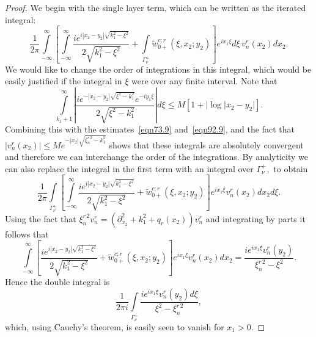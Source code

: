 \documentclass[11pt]{article}
\newcommand\tw{\tilde w_{0+}}
\newcommand\pa{\partial}
\theoremstyle{definition}
\theoremstyle{remark}
\begin{document}
\begin{proof}
  We begin with the single layer term, which can be written as the iterated
  integral:
  \begin{equation}\label{eqn213.91}
    \frac{1}{2\pi}
    \int\limits_{-\infty}^{\infty}\left[\int\limits_{-\infty}^{\infty}\frac{ie^{i|x_2-y_2|\sqrt{k_1^2-\xi^2}}}{2\sqrt{k_1^2-\xi^2}}+
       \int\limits_{\Gamma_{\nu}^+} \tw^{c;r}(\xi,x_2;y_2)\right] e^{ix_1\xi }d\xi\,v_n^{r}(x_2)dx_2.
  \end{equation}
  We would like to change the order of integrations in this integral, which
  would be  easily justified if the integral in $\xi$ were over any finite
  interval. Note that
  \begin{equation}
    \int\limits_{k_1+1}^{\infty}\left|\frac{ie^{-|x_2-y_2|\sqrt{\xi^2-k_1^2}}e^{-iy_1\xi}}{2\sqrt{\xi^2-k_1^2}}\right|d\xi\leq
    M[1+|\log|x_2-y_2|].
  \end{equation}
  Combining this with the estimates~\eqref{eqn73.9} and~\eqref{eqn92.9}, and the fact that
  $|v_n^r(x_2)|\leq Me^{-|x_2|\sqrt{\xi_n^{r\,2}-k_1^2}}$ shows that these integrals are
  absolutely convergent and therefore we can interchange the order of the
  integrations. By analyticity we can also replace the integral in the first term with an
  integral over $\Gamma_{\nu}^+,$ to obtain
   \begin{equation}
        \frac{1}{2\pi}
        \int\limits_{\Gamma_{\nu}^+}\left[\int\limits_{-\infty}^{\infty}
          \frac{ie^{i|x_2-y_2|\sqrt{k_1^2-\xi^2}}}{2\sqrt{k_1^2-\xi^2}}+
       \tw^{c;r}(\xi,x_2;y_2)\right] e^{ix_1\xi}v_n^{r}(x_2)dx_2d\xi.
   \end{equation}
   Using the fact that $\xi^{r\, 2}_nv_n^r=(\pa_{x_2}^2+k_1^2+q_r(x_2))v_n^r$ and
   integrating by parts  it follows that
   \begin{equation}\label{eqn216.93}
     \int\limits_{-\infty}^{\infty}\left[\frac{ie^{i|x_2-y_2|\sqrt{k_1^2-\xi^2}}}{2\sqrt{k_1^2-\xi^2}}+
       \tw^{c;r}(\xi,x_2;y_2)\right] e^{ix_1\xi}v_n^{r}(x_2)dx_2=\frac{ie^{ix_1\xi}v_n^r(y_2)}{\xi_n^{r\,2}-\xi^2}.
   \end{equation}
   Hence the double integral is
   \begin{equation}
     \frac{1}{2\pi i}\int\limits_{\Gamma_{\nu}^+}\frac{ie^{ix_1\xi}v_n^r(y_2)d\xi}{\xi^2-\xi_n^{r\,2}},
   \end{equation}
   which, using Cauchy's theorem, is easily seen to vanish for $x_1>0.$


\end{proof}
\end{document}
